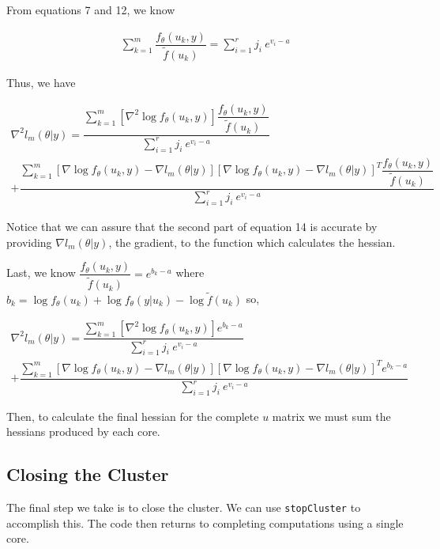 \documentclass{article}
\begin{document}
\noindent From equations 7 and 12, we know

\begin{align}
\sum_{k=1}^m  \dfrac{ f_\theta(u_k,y)   }{\tilde{f}(u_k)} = \sum\limits_{i=1}^r j_i \ e^{v_i - a}
\end{align}

\noindent Thus, we have

\begin{multline}
\nabla^2 l_m(\theta|y)= \dfrac{   \sum_{k=1}^m \left[ \nabla^2 \log f_\theta(u_k,y)     \right]  \dfrac{ f_\theta(u_k,y)}{\tilde{f}(u_k)}  }{\sum\limits_{i=1}^r j_i \ e^{v_i - a}}\\
+ \dfrac{   \sum_{k=1}^m \left[ \nabla \log f_\theta(u_k,y)  - \nabla l_m(\theta|y)   \right] \left[ \nabla \log f_\theta(u_k,y)  -\nabla l_m(\theta|y)  \right]^T  \dfrac{ f_\theta(u_k,y)   }{\tilde{f}(u_k)}   }{\sum\limits_{i=1}^r j_i \ e^{v_i - a}}
\end{multline}

\noindent Notice that we can assure that the second part of equation 14 is accurate by providing $\nabla l_m (\theta|y)$, the gradient, to the function which calculates the hessian.

Last, we know $\dfrac{f_\theta(u_k, y)}{\tilde{f}(u_k)} = e^{b_k -a}$ where $b_k = \log f_\theta (u_k) + \log f_\theta (y|u_k) - \log  \tilde{f} (u_k)$ so, 

\begin{multline}
\nabla^2 l_m(\theta|y)= \dfrac{   \sum_{k=1}^m \left[ \nabla^2 \log f_\theta(u_k,y)     \right]  e^{b_k-a}  }{\sum\limits_{i=1}^r j_i \ e^{v_i - a}}\\
+ \dfrac{   \sum_{k=1}^m \left[ \nabla \log f_\theta(u_k,y)  - \nabla l_m(\theta|y)   \right] \left[ \nabla \log f_\theta(u_k,y)  -\nabla l_m(\theta|y)  \right]^T  e^{b_k-a}}{\sum\limits_{i=1}^r j_i \ e^{v_i - a}}
\end{multline}

Then, to calculate the final hessian for the complete $u$ matrix we must sum the hessians produced by each core. 

\subsection{Closing the Cluster}
The final step we take is to close the cluster. We can use \texttt{stopCluster} to accomplish this. The code then returns to completing computations using a single core. 
\end{document}
